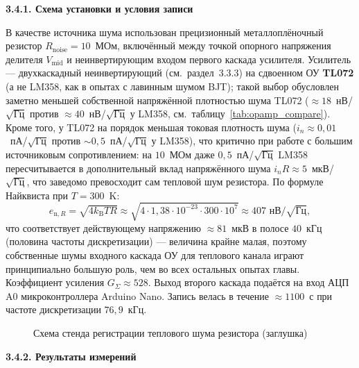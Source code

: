 \textbf{3.4.1. Схема установки и условия записи}

В качестве источника шума использован прецизионный металлоплёночный резистор
$R_\mathrm{noise}=10$~МОм, включённый между точкой опорного напряжения делителя
$V_\mathrm{mid}$ и неинвертирующим входом первого каскада усилителя. Усилитель ---
двухкаскадный неинвертирующий (см.~раздел~3.3.3) на сдвоенном ОУ \textbf{TL072}
(а не LM358, как в опытах с лавинным шумом BJT); такой выбор обусловлен заметно
меньшей собственной напряжённой плотностью шума TL072 (${\approx}18$~нВ/$\sqrt{\mathrm{Гц}}$
против ${\approx}40$~нВ/$\sqrt{\mathrm{Гц}}$ у LM358,
см.~таблицу~\ref{tab:opamp_compare}). Кроме того, у TL072 на порядок меньшая
токовая плотность шума ($i_n\!\approx\!0{,}01$~пА/$\sqrt{\mathrm{Гц}}$ против
$\sim\!0{,}5$~пА/$\sqrt{\mathrm{Гц}}$ у LM358), что критично при работе с
большим источниковым сопротивлением: на $10$~МОм даже $0{,}5$~пА/$\sqrt{\mathrm{Гц}}$
LM358 пересчитывается в дополнительный вклад напряжённого шума
$i_n R\approx 5$~мкВ/$\sqrt{\mathrm{Гц}}$, что заведомо превосходит сам тепловой
шум резистора. По формуле Найквиста при $T=300$~K:
\begin{equation}
  e_{\mathrm{n},R}=\sqrt{4k_\mathrm{B} T R}
  \approx \sqrt{4\cdot 1{,}38\cdot 10^{-23}\cdot 300\cdot 10^{7}}
  \approx 407\text{ нВ}/\sqrt{\mathrm{Гц}},
\end{equation}
что соответствует действующему напряжению ${\approx}81$~мкВ в полосе $40$~кГц
(половина частоты дискретизации) --- величина крайне малая, поэтому собственные
шумы входного каскада ОУ для теплового канала играют принципиально большую роль,
чем во всех остальных опытах главы. Коэффициент усиления $G_\Sigma\approx 528$.
Выход второго каскада подаётся на вход АЦП A0 микроконтроллера Arduino Nano.
Запись велась в течение ${\approx}1100$~с при частоте дискретизации $76{,}9$~кГц.

\begin{figure}[htbp]
  \centering
  \caption{Схема стенда регистрации теплового шума резистора (заглушка)}
  \label{fig:thermal_schema_new}
\end{figure}

\textbf{3.4.2. Результаты измерений}

